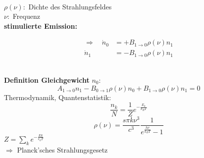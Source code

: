 \\[15pt]
$ \rho(\nu) : $ Dichte des Strahlungsfeldes\\
$ \nu : $ Frequenz\\[5pt]
\textbf{stimulierte Emission:}\\
\begin{minipage}{.5\linewidth}
	\begin{align*}
	\Rightarrow \quad \dot{n}_0 &= + B_{1 \to 0} \rho(\nu) n_1 \\
	\dot{n}_1 &= - B_{1 \to 0} \rho(\nu) n_1
	\end{align*}
\end{minipage}%
\begin{minipage}{.5\linewidth}
	\centering
\end{minipage}%
\\[15pt]
\textbf{Definition Gleichgewicht}
$ n_0 : $
\begin{equation*}
A_{1 \to 0} n_1 - B_{0 \to 1} \rho(\nu) n_0 + B_{1 \to 0} \rho(\nu) n_1 = 0
\end{equation*}
Thermodynamik, Quantenstatistik:
\begin{equation*}
\frac{n_k}{N} = \frac{1}{Z} e^{-\frac{E_k}{k_B T}}
\end{equation*}
\begin{equation*}
\rho(\nu) = \frac{s \pi k \nu^3}{c^3} \frac{1}{e^{\frac{h \nu}{k_B T}} - 1}
\end{equation*}
$ Z = \sum_k e^{-\frac{E k}{e_k T}} $\\[5pt]
$ \Rightarrow $ Planck'sches Strahlungsgesetz